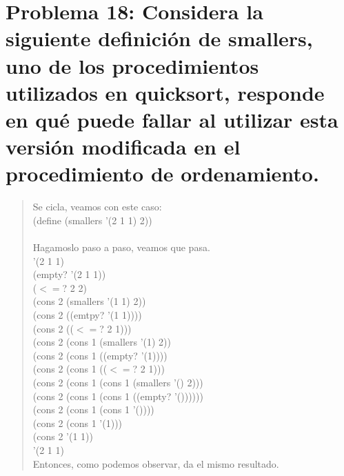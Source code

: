 \documentclass{article}
\begin{document}
\section{Problema 18: Considera la siguiente definición de smallers, uno de los procedimientos utilizados en quicksort, responde en qué puede fallar al utilizar esta versión modificada en el procedimiento de ordenamiento.}
\begin{quote}
    Se cicla, veamos con este caso:\\
    (define (smallers '(2 1 1) 2))\\
    \\
    Hagamoslo paso a paso, veamos que pasa.\\
    '(2 1 1)\\
    (empty? '(2 1 1))\\
    ($<=$? 2 2)\\
    (cons 2 (smallers '(1 1) 2))\\
    (cons 2 ((emtpy? '(1 1))))\\
    (cons 2 (($<=$? 2 1)))\\
    (cons 2 (cons 1 (smallers '(1) 2))\\
    (cons 2 (cons 1 ((empty? '(1))))\\
    (cons 2 (cons 1 (($<=$? 2 1)))\\
    (cons 2 (cons 1 (cons 1 (smallers '() 2)))\\
    (cons 2 (cons 1 (cons 1 ((empty? '())))))\\
    (cons 2 (cons 1 (cons 1 '())))\\
    (cons 2 (cons 1 '(1)))\\
    (cons 2 '(1 1))\\
    '(2 1 1)\\
    Entonces, como podemos observar, da el mismo resultado.
\end{quote}
\end{document}
